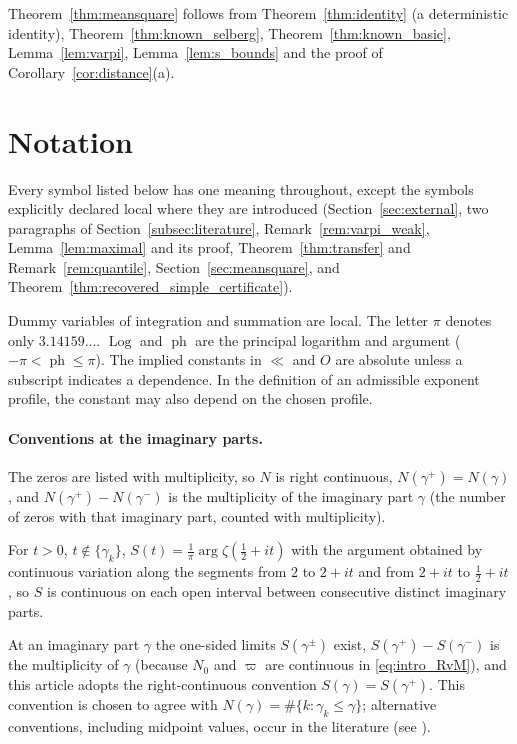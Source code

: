 \documentclass[11pt,a4paper]{article}
\makeatletter
\numberwithin{equation}{section}
\DeclareRobustCommand{\CGref}[1]{\ref{#1}}
\DeclareRobustCommand{\CGeqref}[1]{\eqref{#1}}
\DeclareRobustCommand{\CGcite}[2][]{\if\relax\detokenize{#1}\relax\cite{#2}\else\cite[#1]{#2}\fi}
\let\CG@origref\ref
\let\CG@origeqref\eqref
\newcommand{\CG@gettip}[1]{\@ifundefined{CGTip@#1}{#1}{\csname CGTip@#1\endcsname}}
\newcommand{\CG@getbib}[1]{\@ifundefined{CGBib@#1}{#1}{\csname CGBib@#1\endcsname}}
\DeclareRobustCommand{\CGref}[1]{\pdftooltip{\CG@origref{#1}}{\CG@gettip{#1}}}
\DeclareRobustCommand{\CGeqref}[1]{\pdftooltip{\CG@origeqref{#1}}{\CG@gettip{#1}}}
\DeclareRobustCommand{\CGcite}[2][]{\pdftooltip{\if\relax\detokenize{#1}\relax\cite{#2}\else\cite[#1]{#2}\fi}{\CG@getbib{#2}}}
\theoremstyle{definition}
\theoremstyle{remark}
\newcommand{\Nz}{N_0} %
\makeatother
\begin{document}
Theorem~\CGref{thm:meansquare} follows from Theorem~\CGref{thm:identity} (a deterministic identity), Theorem~\CGref{thm:known_selberg}, Theorem~\CGref{thm:known_basic}, Lemma~\CGref{lem:varpi}, Lemma~\CGref{lem:s_bounds} and the proof of Corollary~\CGref{cor:distance}(a).

\section{Notation}\label{sec:notation}

Every symbol listed below has one meaning throughout, except the symbols explicitly declared local where they are introduced (Section~\CGref{sec:external}, two paragraphs of Section~\CGref{subsec:literature}, Remark~\CGref{rem:varpi_weak}, Lemma~\CGref{lem:maximal} and its proof, Theorem~\CGref{thm:transfer} and Remark~\CGref{rem:quantile}, Section~\CGref{sec:meansquare}, and Theorem~\CGref{thm:recovered_simple_certificate}).

Dummy variables of integration and summation are local. The letter $\pi$ denotes only $3.14159\ldots$. $\operatorname{Log}$ and $\operatorname{ph}$ are the principal logarithm and argument ($-\pi<\operatorname{ph}\le\pi$). The implied constants in $\ll$ and $O$ are absolute unless a subscript indicates a dependence. In the definition of an admissible exponent profile, the constant may also depend on the chosen profile.

\paragraph{Conventions at the imaginary parts.}
The zeros are listed with multiplicity, so $N$ is right continuous, $N(\gamma^+)=N(\gamma)$, and $N(\gamma^+)-N(\gamma^-)$ is the multiplicity of the imaginary part $\gamma$ (the number of zeros with that imaginary part, counted with multiplicity).

For $t>0$, $t\notin\{\gamma_k\}$, $S(t)=\frac1\pi\arg\zeta(\frac12+it)$ with the argument obtained by continuous variation along the segments from $2$ to $2+it$ and from $2+it$ to $\frac12+it$, so $S$ is continuous on each open interval between consecutive distinct imaginary parts.

At an imaginary part $\gamma$ the one-sided limits $S(\gamma^\pm)$ exist, $S(\gamma^+)-S(\gamma^-)$ is the multiplicity of $\gamma$ (because $\Nz$ and $\varpi$ are continuous in \CGeqref{eq:intro_RvM}), and this article adopts the right-continuous convention $S(\gamma)=S(\gamma^+)$. This convention is chosen to agree with $N(\gamma)=\#\{k:\gamma_k\le\gamma\}$; alternative conventions, including midpoint values, occur in the literature (see \CGcite[\S9.3]{Titchmarsh1986}).
\end{document}
